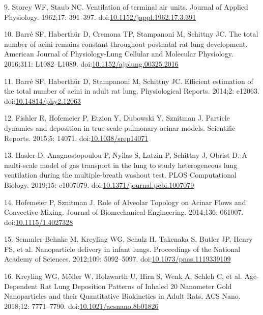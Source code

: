 \documentclass[
  american,
]{article}
\newenvironment{cslreferences}%
  {}%
  {\par}
\begin{document}
\begin{cslreferences}
\leavevmode\hypertarget{ref-WDrIHn9p}{}%
9. Storey WF, Staub NC. Ventilation of terminal air units. Journal of Applied Physiology. 1962;17: 391--397. doi:\href{https://doi.org/10.1152/jappl.1962.17.3.391}{10.1152/jappl.1962.17.3.391}

\leavevmode\hypertarget{ref-14OP85b2F}{}%
10. Barré SF, Haberthür D, Cremona TP, Stampanoni M, Schittny JC. The total number of acini remains constant throughout postnatal rat lung development. American Journal of Physiology-Lung Cellular and Molecular Physiology. 2016;311: L1082--L1089. doi:\href{https://doi.org/10.1152/ajplung.00325.2016}{10.1152/ajplung.00325.2016}

\leavevmode\hypertarget{ref-uFNlWogb}{}%
11. Barré SF, Haberthür D, Stampanoni M, Schittny JC. Efficient estimation of the total number of acini in adult rat lung. Physiological Reports. 2014;2: e12063. doi:\href{https://doi.org/10.14814/phy2.12063}{10.14814/phy2.12063}

\leavevmode\hypertarget{ref-CVl41LwO}{}%
12. Fishler R, Hofemeier P, Etzion Y, Dubowski Y, Sznitman J. Particle dynamics and deposition in true-scale pulmonary acinar models. Scientific Reports. 2015;5: 14071. doi:\href{https://doi.org/10.1038/srep14071}{10.1038/srep14071}

\leavevmode\hypertarget{ref-eb0gk6VO}{}%
13. Hasler D, Anagnostopoulou P, Nyilas S, Latzin P, Schittny J, Obrist D. A multi-scale model of gas transport in the lung to study heterogeneous lung ventilation during the multiple-breath washout test. PLOS Computational Biology. 2019;15: e1007079. doi:\href{https://doi.org/10.1371/journal.pcbi.1007079}{10.1371/journal.pcbi.1007079}

\leavevmode\hypertarget{ref-1DP2FRUSZ}{}%
14. Hofemeier P, Sznitman J. Role of Alveolar Topology on Acinar Flows and Convective Mixing. Journal of Biomechanical Engineering. 2014;136: 061007. doi:\href{https://doi.org/10.1115/1.4027328}{10.1115/1.4027328}

\leavevmode\hypertarget{ref-yHHhvOtP}{}%
15. Semmler-Behnke M, Kreyling WG, Schulz H, Takenaka S, Butler JP, Henry FS, et al. Nanoparticle delivery in infant lungs. Proceedings of the National Academy of Sciences. 2012;109: 5092--5097. doi:\href{https://doi.org/10.1073/pnas.1119339109}{10.1073/pnas.1119339109}

\leavevmode\hypertarget{ref-18DcNLAv6}{}%
16. Kreyling WG, Möller W, Holzwarth U, Hirn S, Wenk A, Schleh C, et al. Age-Dependent Rat Lung Deposition Patterns of Inhaled 20 Nanometer Gold Nanoparticles and their Quantitative Biokinetics in Adult Rats. ACS Nano. 2018;12: 7771--7790. doi:\href{https://doi.org/10.1021/acsnano.8b01826}{10.1021/acsnano.8b01826}


\end{cslreferences}
\end{document}
